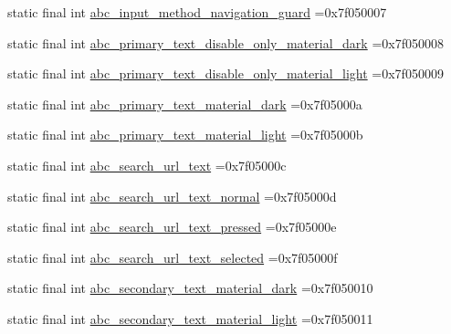 \begin{DoxyCompactItemize}
static final int \mbox{\hyperlink{classbr_1_1unb_1_1cic_1_1mp_1_1marketmaster_1_1test_1_1R_1_1color_a917c384b0c519c342084de2e7a6c65cf}{abc\+\_\+input\+\_\+method\+\_\+navigation\+\_\+guard}} =0x7f050007
\item 
static final int \mbox{\hyperlink{classbr_1_1unb_1_1cic_1_1mp_1_1marketmaster_1_1test_1_1R_1_1color_a6bd2bd2407154a2e0084ff3e13bc46f0}{abc\+\_\+primary\+\_\+text\+\_\+disable\+\_\+only\+\_\+material\+\_\+dark}} =0x7f050008
\item 
static final int \mbox{\hyperlink{classbr_1_1unb_1_1cic_1_1mp_1_1marketmaster_1_1test_1_1R_1_1color_a4ba9d8a50ce03145f5615fbd474e2962}{abc\+\_\+primary\+\_\+text\+\_\+disable\+\_\+only\+\_\+material\+\_\+light}} =0x7f050009
\item 
static final int \mbox{\hyperlink{classbr_1_1unb_1_1cic_1_1mp_1_1marketmaster_1_1test_1_1R_1_1color_ac5ed78fd3db737e91c6a800d189ac569}{abc\+\_\+primary\+\_\+text\+\_\+material\+\_\+dark}} =0x7f05000a
\item 
static final int \mbox{\hyperlink{classbr_1_1unb_1_1cic_1_1mp_1_1marketmaster_1_1test_1_1R_1_1color_a9eb92f107b7133595eed34253af9fa1b}{abc\+\_\+primary\+\_\+text\+\_\+material\+\_\+light}} =0x7f05000b
\item 
static final int \mbox{\hyperlink{classbr_1_1unb_1_1cic_1_1mp_1_1marketmaster_1_1test_1_1R_1_1color_a36367d46caf97ba565855911dda12536}{abc\+\_\+search\+\_\+url\+\_\+text}} =0x7f05000c
\item 
static final int \mbox{\hyperlink{classbr_1_1unb_1_1cic_1_1mp_1_1marketmaster_1_1test_1_1R_1_1color_abb4989d146b52e959c72c1ef1f89c9fc}{abc\+\_\+search\+\_\+url\+\_\+text\+\_\+normal}} =0x7f05000d
\item 
static final int \mbox{\hyperlink{classbr_1_1unb_1_1cic_1_1mp_1_1marketmaster_1_1test_1_1R_1_1color_a6d0d1d3f2e782a01418ce4f0fd46f552}{abc\+\_\+search\+\_\+url\+\_\+text\+\_\+pressed}} =0x7f05000e
\item 
static final int \mbox{\hyperlink{classbr_1_1unb_1_1cic_1_1mp_1_1marketmaster_1_1test_1_1R_1_1color_a0d7025d292045cfa5189cfc6292f2df7}{abc\+\_\+search\+\_\+url\+\_\+text\+\_\+selected}} =0x7f05000f
\item 
static final int \mbox{\hyperlink{classbr_1_1unb_1_1cic_1_1mp_1_1marketmaster_1_1test_1_1R_1_1color_adbc13346effe1c1af9e914d82dee21f3}{abc\+\_\+secondary\+\_\+text\+\_\+material\+\_\+dark}} =0x7f050010
\item 
static final int \mbox{\hyperlink{classbr_1_1unb_1_1cic_1_1mp_1_1marketmaster_1_1test_1_1R_1_1color_a6ce68e422372bec8f07dc1030b116ce5}{abc\+\_\+secondary\+\_\+text\+\_\+material\+\_\+light}} =0x7f050011

\end{DoxyCompactItemize}
